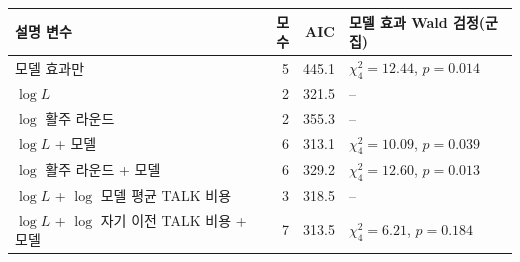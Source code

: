 \begin{tabular}{lrrl}
\toprule
설명 변수 & 모수 & AIC & 모델 효과 Wald 검정(군집) \\
\midrule
모델 효과만 & 5 & 445.1 & $\chi^2_{4}=12.44$, $p=0.014$ \\
$\log L$ & 2 & 321.5 & -- \\
$\log$ 활주 라운드 & 2 & 355.3 & -- \\
$\log L$ + 모델 & 6 & 313.1 & $\chi^2_{4}=10.09$, $p=0.039$ \\
$\log$ 활주 라운드 + 모델 & 6 & 329.2 & $\chi^2_{4}=12.60$, $p=0.013$ \\
$\log L$ + $\log$ 모델 평균 TALK 비용 & 3 & 318.5 & -- \\
$\log L$ + $\log$ 자기 이전 TALK 비용 + 모델 & 7 & 313.5 & $\chi^2_{4}=6.21$, $p=0.184$ \\
\bottomrule
\end{tabular}
